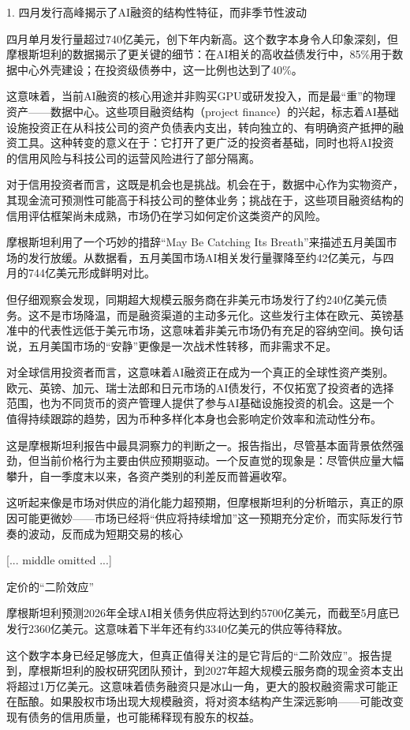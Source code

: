 \documentclass[11pt]{ctexart}
\begin{document}
1. 四月发行高峰揭示了AI融资的结构性特征，而非季节性波动

四月单月发行量超过740亿美元，创下年内新高。这个数字本身令人印象深刻，但摩根斯坦利的数据揭示了更关键的细节：在AI相关的高收益债发行中，85\%用于数据中心外壳建设；在投资级债券中，这一比例也达到了40\%。

这意味着，当前AI融资的核心用途并非购买GPU或研发投入，而是最“重”的物理资产——数据中心。这些项目融资结构（project finance）的兴起，标志着AI基础设施投资正在从科技公司的资产负债表内支出，转向独立的、有明确资产抵押的融资工具。这种转变的意义在于：它打开了更广泛的投资者基础，同时也将AI投资的信用风险与科技公司的运营风险进行了部分隔离。

对于信用投资者而言，这既是机会也是挑战。机会在于，数据中心作为实物资产，其现金流可预测性可能高于科技公司的整体业务；挑战在于，这些项目融资结构的信用评估框架尚未成熟，市场仍在学习如何定价这类资产的风险。

摩根斯坦利用了一个巧妙的措辞“May Be Catching Its Breath”来描述五月美国市场的发行放缓。从数据看，五月美国市场AI相关发行量骤降至约42亿美元，与四月的744亿美元形成鲜明对比。

但仔细观察会发现，同期超大规模云服务商在非美元市场发行了约240亿美元债务。这不是市场降温，而是融资渠道的主动多元化。这些发行主体在欧元、英镑基准中的代表性远低于美元市场，这意味着非美元市场仍有充足的容纳空间。换句话说，五月美国市场的“安静”更像是一次战术性转移，而非需求不足。

对全球信用投资者而言，这意味着AI融资正在成为一个真正的全球性资产类别。欧元、英镑、加元、瑞士法郎和日元市场的AI债发行，不仅拓宽了投资者的选择范围，也为不同货币的资产管理人提供了参与AI基础设施投资的机会。这是一个值得持续跟踪的趋势，因为币种多样化本身也会影响定价效率和流动性分布。

这是摩根斯坦利报告中最具洞察力的判断之一。报告指出，尽管基本面背景依然强劲，但当前价格行为主要由供应预期驱动。一个反直觉的现象是：尽管供应量大幅攀升，自一季度末以来，各资产类别的利差反而普遍收窄。

这听起来像是市场对供应的消化能力超预期，但摩根斯坦利的分析暗示，真正的原因可能更微妙——市场已经将“供应将持续增加”这一预期充分定价，而实际发行节奏的波动，反而成为短期交易的核心

[... middle omitted ...]

定价的“二阶效应”

摩根斯坦利预测2026年全球AI相关债务供应将达到约5700亿美元，而截至5月底已发行2360亿美元。这意味着下半年还有约3340亿美元的供应等待释放。

这个数字本身已经足够庞大，但真正值得关注的是它背后的“二阶效应”。报告提到，摩根斯坦利的股权研究团队预计，到2027年超大规模云服务商的现金资本支出将超过1万亿美元。这意味着债务融资只是冰山一角，更大的股权融资需求可能正在酝酿。如果股权市场出现大规模融资，将对资本结构产生深远影响——可能改变现有债务的信用质量，也可能稀释现有股东的权益。
\end{document}
